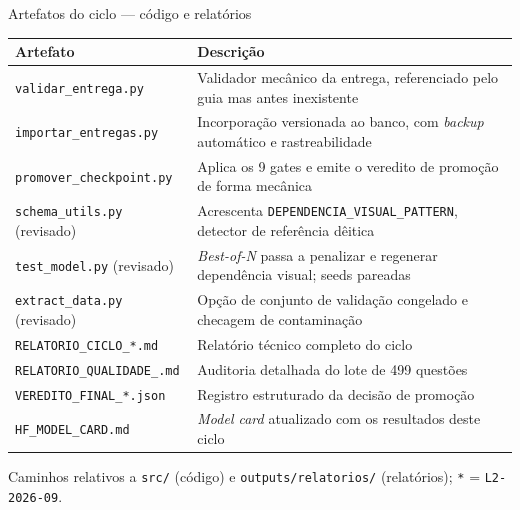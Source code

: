 \documentclass[aspectratio=169,11pt]{beamer}
\begin{document}
\begin{frame}{Artefatos do ciclo — código e relatórios}
  \footnotesize
  \renewcommand{\arraystretch}{0.88}
  \begin{table}
    \centering
    \begin{tabular}{@{}p{3.3cm}p{8.4cm}@{}}
      \toprule
      \textbf{Artefato} & \textbf{Descrição} \\
      \midrule
      \texttt{validar\_entrega.py} & Validador mecânico da entrega, referenciado pelo guia mas antes inexistente \\
      \texttt{importar\_entregas.py} & Incorporação versionada ao banco, com \emph{backup} automático e rastreabilidade \\
      \texttt{promover\_checkpoint.py} & Aplica os 9 gates e emite o veredito de promoção de forma mecânica \\
      \texttt{schema\_utils.py} (revisado) & Acrescenta \texttt{DEPENDENCIA\_VISUAL\_PATTERN}, detector de referência dêitica \\
      \texttt{test\_model.py} (revisado) & \emph{Best-of-N} passa a penalizar e regenerar dependência visual; seeds pareadas \\
      \texttt{extract\_data.py} (revisado) & Opção de conjunto de validação congelado e checagem de contaminação \\
      \texttt{RELATORIO\_CICLO\_*.md} & Relatório técnico completo do ciclo \\
      \texttt{RELATORIO\_QUALIDADE\_\allowbreak *.md} & Auditoria detalhada do lote de 499 questões \\
      \texttt{VEREDITO\_FINAL\_*.json} & Registro estruturado da decisão de promoção \\
      \texttt{HF\_MODEL\_CARD.md} & \emph{Model card} atualizado com os resultados deste ciclo \\
      \bottomrule
    \end{tabular}
  \end{table}
  \vspace{2pt}
  \scriptsize\color{basegray} Caminhos relativos a \texttt{src/} (código) e
  \texttt{outputs/relatorios/} (relatórios); \texttt{*} = \texttt{L2-2026-09}.
\end{frame}

\end{document}
